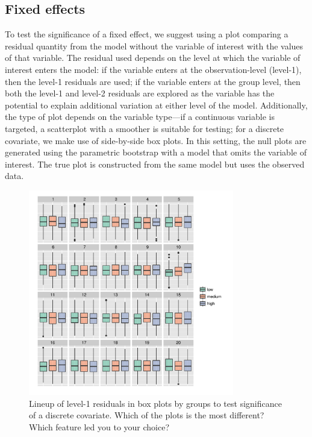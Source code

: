 \documentclass[12pt]{article} %
\newcommand{\alnote}[1]{\todo[inline,color=green!40]{#1}} %
\begin{document}
\subsection{Fixed effects} 
To test the significance of a fixed effect, we suggest using a plot comparing a residual quantity from the model without the variable of interest with the values of that variable. 
The residual used depends on the level at which the variable of interest enters the model: if the variable enters at the observation-level (level-1), then the level-1 residuals are used; if the variable enters at the group level, then both the level-1 and level-2 residuals are explored as the variable has the potential to explain additional variation at either level of the model.
Additionally, the type of plot depends on the variable type---if a continuous variable is targeted,  a scatterplot with a smoother is suitable for testing; for a discrete covariate, we make use of side-by-side box plots. 
In this setting, the null plots are generated using the parametric bootstrap  with a model that omits the variable of interest. The true plot is constructed from the same model but uses the observed data. 

\begin{figure}[h]
	\centering
	\includegraphics[width=0.8\textwidth]{autism2-ordered-10.pdf}
	\caption{\label{fig:boxplot-ordered} {Lineup of level-1 residuals in box plots  by groups to test significance of a discrete covariate.}
	Which of the plots is the most different? Which feature led you to your choice?} 
\end{figure}
\end{document}
